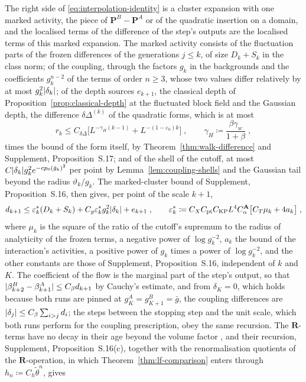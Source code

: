 \documentclass[11pt]{preprint}
\DeclarePairedDelimiter{\abs}{\lvert}{\rvert}
\numberwithin{equation}{section}
\theoremstyle{definition}
\theoremstyle{remark}
\theoremstyle{plain}
\begin{document}
The right side of \eqref{eq:interpolation-identity} is a cluster expansion with one marked activity, the piece of $\mathbf P^B - \mathbf P^A$ or of the quadratic insertion on a domain, and the localised terms of the difference of the step's outputs are the localised terms of this marked expansion. The marked activity consists of the fluctuation parts of the frozen differences of the generations $j \leq k$, of size $D_k + S_k$ in the class norm; of the coupling, through the factors $g_k$ in the backgrounds and the coefficients $g_k^{n-2}$ of the terms of order $n \geq 3$, whose two values differ relatively by at most $g_k^2\abs{\delta_k}$; of the depth sources $e_{k+1}$, the classical depth of Proposition~\ref{prop:classical-depth} at the fluctuated block field and the Gaussian depth, the difference $\delta\Delta^{(k)}$ of the quadratic forms, which is at most
\begin{equation}\label{eq:gaussian-depth}
    r_k \leq C_{\delta\Delta}\bigl[L^{-\gamma_H(k-1)} + L^{-(1-\varepsilon_0)k}\bigr]\;,
    \qquad
    \gamma_H \coloneqq \frac{\beta\gamma_w}{1 + \beta}\;,
\end{equation}
times the bound of the form itself, by Theorem~\ref{thm:walk-difference} and Supplement, Proposition~S.17; and of the shell of the cutoff, at most $C\abs{\delta_k}g_k^2e^{-cp_0(\hat g_k)^2}$ per point by Lemma~\ref{lem:coupling-shells} and the Gaussian tail beyond the radius $\vartheta_k/g_k$. The marked-cluster bound of Supplement, Proposition~S.16, then gives, per point of the scale $k + 1$,
\begin{equation}\label{eq:recursion}
    d_{k+1} \leq \varepsilon^*_k(D_k + S_k) + C_g\varepsilon^*_kg_k^2\abs{\delta_k} + e_{k+1}\;,
    \qquad
    \varepsilon^*_k \coloneqq C_XC_{\mathrm{pt}}C_{\mathrm{KP}}L^4C^{\mathbf A}_\alpha\bigl[C_T\mu_k + 4a_k\bigr]\;,
\end{equation}
where $\mu_k$ is the square of the ratio of the cutoff's supremum to the radius of analyticity of the frozen terms, a negative power of $\log g_k^{-2}$, $a_k$ the bound of the interaction's activities, a positive power of $g_k$ times a power of $\log g_k^{-2}$, and the other constants are those of Supplement, Proposition~S.16, independent of $k$ and $K$. The coefficient of the flow is the marginal part of the step's output, so that $\abs{\beta^B_{k+2} - \beta^A_{k+1}} \leq C_\beta d_{k+1}$ by Cauchy's estimate, and from $\delta_K = 0$, which holds because both runs are pinned at $g^A_K = g^B_{K+1} = \bar g$, the coupling differences are $\abs{\delta_j} \leq C_\beta\sum_{i > j}d_i$; the steps between the stopping step and the unit scale, which both runs perform for the coupling prescription, obey the same recursion. The $\mathbf R$-terms have no decay in their age beyond the volume factor \cite[p.~283]{BalabanCRE}, and their recursion, Supplement, Proposition~S.16(c), together with the renormalisation quotients of the $\mathbf R$-operation, in which Theorem~\ref{thm:lf-comparison} enters through $h_n \coloneqq C_h\tilde\theta^n$, gives
\end{document}
